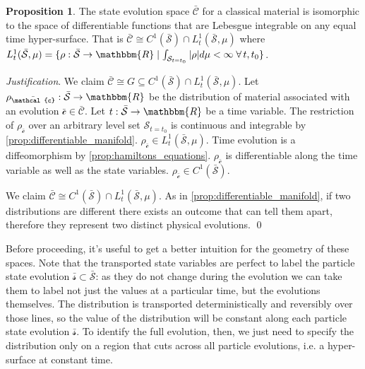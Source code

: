 \documentclass[aps,pra,10pt,twocolumn,floatfix,nofootinbib]{revtex4-1}
\numberwithin{equation}{section}
\theoremstyle{definition}
\newtheorem{prop}[equation]{Proposition}
\newenvironment{justification}{\emph{Justification}.}{\qed}
\begin{document}
\begin{prop}\label{prop:state_evolution_space}
	The state evolution space $\bar{\mathcal{C}}$ for a classical material is isomorphic to the space of differentiable functions that are Lebesgue integrable on any equal time hyper-surface. That is $\bar{\mathcal{C}} \cong  C^1(\bar{\mathcal{S}})\cap L^1_t(\bar{\mathcal{S}}, \mu)$ where $L^1_t(\bar{\mathcal{S}}, \mu)=\{{\rho: \bar{\mathcal{S}} \rightarrow \mathbbm{R}} \; | \; {\int_{\mathcal{S}_{t=t_0}} |\rho| d\mu < \infty} \; \forall \, t, t_0 \}$.
\end{prop}

\begin{justification}
	We claim $\bar{\mathcal{C}} \cong  G \subseteq C^1(\bar{\mathcal{S}})\cap L^1_t(\bar{\mathcal{S}}, \mu)$. Let $\rho_{\bar{\mathcal{c}}} : \bar{\mathcal{S}} \rightarrow \mathbbm{R}$ be the distribution of material associated with an evolution $\bar{\mathcal{c}} \in \bar{\mathcal{C}}$. Let $t : \bar{\mathcal{S}} \rightarrow \mathbbm{R}$ be a time variable. 
	The restriction of $\rho_{\bar{\mathcal{c}}}$ over an arbitrary level set $\mathcal{S}_{t=t_0}$ is continuous and integrable by \ref{prop:differentiable_manifold}. $\rho_{\bar{\mathcal{c}}} \in L^1_t(\bar{\mathcal{S}}, \mu)$. Time evolution is a diffeomorphism by \ref{prop:hamiltons_equations}. $\rho_{\bar{\mathcal{c}}}$ is differentiable along the time variable as well as the state variables. $\rho_{\bar{\mathcal{c}}} \in C^1(\bar{\mathcal{S}})$.
	
	We claim $\bar{\mathcal{C}} \cong  C^1(\bar{\mathcal{S}})\cap L^1_t(\bar{\mathcal{S}}, \mu)$. As in \ref{prop:differentiable_manifold}, if two distributions are different there exists an outcome that can tell them apart, therefore they represent two distinct physical evolutions.
\end{justification}

Before proceeding, it's useful to get a better intuition for the geometry of these spaces. Note that the transported state variables are perfect to label the particle state evolution $\bar{\mathcal{s}} \subset \bar{\mathcal{S}}$: as they do not change during the evolution we can take them to label not just the values at a particular time, but the evolutions themselves. The distribution is transported deterministically and reversibly over those lines, so the value of the distribution will be constant along each particle state evolution $\bar{\mathcal{s}}$. To identify the full evolution, then, we just need to specify the distribution only on a region that cuts across all particle evolutions, i.e. a hyper-surface at constant time.
\end{document}
